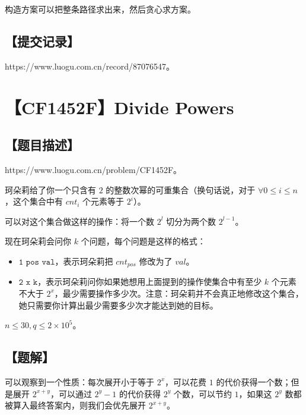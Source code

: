 \documentclass[UTF8,12pt,a4paper]{ctexart}
\begin{document}
	构造方案可以把整条路径求出来，然后贪心求方案。
	
	\subsection*{【提交记录】}
	
	https://www.luogu.com.cn/record/87076547。
	
	
	\section*{【CF1452F】Divide Powers}
	
	\subsection*{【题目描述】}
	
	https://www.luogu.com.cn/problem/CF1452F。
	
	珂朵莉给了你一个只含有 $2$ 的整数次幂的可重集合（换句话说，对于 $\forall 0 \le i \le n$，这个集合中有 $cnt_i$ 个元素等于 $2^i$）。
	
	可以对这个集合做这样的操作：将一个数 $2^l$ 切分为两个数 $2^{l-1}$。
	
	现在珂朵莉会问你 $k$ 个问题，每个问题是这样的格式：
	
	\begin{itemize}
		\item $\texttt{1~pos~val}$，表示珂朵莉把 $cnt_{pos}$ 修改为了 $val$。
		\item $\texttt{2~x~k}$，表示珂朵莉问你如果她想用上面提到的操作使集合中有至少 $k$ 个元素不大于 $2^x$，最少需要操作多少次。注意：珂朵莉并不会真正地修改这个集合，她只需要你计算出最少需要多少次才能达到她的目标。
	\end{itemize}

	$n\le 30,q\le 2\times 10^5$。
	
	\subsection*{【题解】}
	
	可以观察到一个性质：每次展开小于等于 $2^x$，可以花费 $1$ 的代价获得一个数；但是展开 $2^{x+y}$，可以通过 $2^y-1$ 的代价获得 $2^y$ 个数，可以节约 $1$，如果这 $2^y$ 数都被算入最终答案内，则我们会优先展开 $2^{x+y}$。
	
\end{document}
